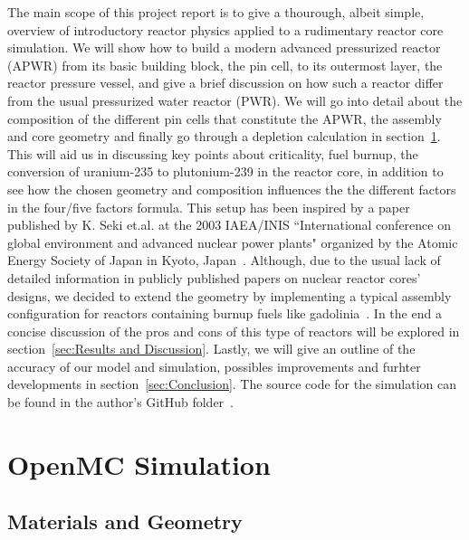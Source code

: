 \documentclass[twocolumn,a4paper,10pt]{article}
\begin{document}
\par
The main scope of this project report is to give a thourough, albeit simple, overview of introductory reactor physics applied to a rudimentary reactor core simulation. We will show how to build a modern advanced pressurized reactor (APWR) from its basic building block, the pin cell, to its outermost layer, the reactor pressure vessel, and give a brief discussion on how such a reactor differ from the usual pressurized water reactor (PWR). We will go into detail about the composition of the different pin cells that constitute the APWR, the assembly and core geometry and finally go through a depletion calculation in section~\ref{sec:Simulation}. This will aid us in discussing key points about criticality, fuel burnup, the conversion of uranium-235 to plutonium-239 in the reactor core, in addition to see how the chosen geometry and composition influences the the different factors in the four/five factors formula. This setup has been inspired by a paper published by K. Seki et.al. at the 2003 IAEA/INIS ``International conference on global environment and advanced nuclear power plants" organized by the Atomic Energy Society of Japan in Kyoto, Japan~\cite{APWR}. Although, due to the usual lack of detailed information in publicly published papers on nuclear reactor cores' designs, we decided to extend the geometry by implementing a typical assembly configuration for reactors containing burnup fuels like gadolinia~\cite{BurnupFuel}. In the end a concise discussion of the pros and cons of this type of reactors will be explored in section~\ref{sec:Results and Discussion}. Lastly, we will give an outline of the accuracy of our model and simulation, possibles improvements and furhter developments in section~\ref{sec:Conclusion}. The source code for the simulation can be found in the author's GitHub folder~\cite{GitHub}.


\section{OpenMC Simulation}
\label{sec:Simulation}

\subsection[Materials and Geometry]{\centering Materials and Geometry}
\label{subsec:Materials and Geometry}
\end{document}
